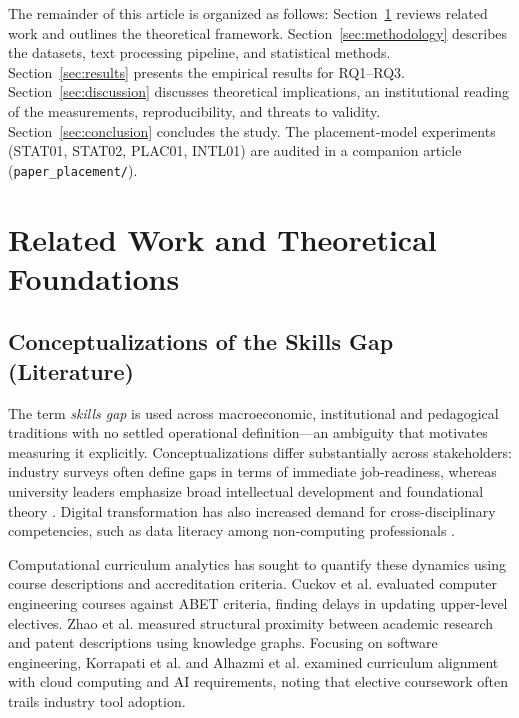 \documentclass[journal]{IEEEtran}
\begin{document}
The remainder of this article is organized as follows: Section~\ref{sec:related_work} reviews related work and outlines the theoretical framework. Section~\ref{sec:methodology} describes the datasets, text processing pipeline, and statistical methods. Section~\ref{sec:results} presents the empirical results for RQ1--RQ3. Section~\ref{sec:discussion} discusses theoretical implications, an institutional reading of the measurements, reproducibility, and threats to validity. Section~\ref{sec:conclusion} concludes the study. The placement-model experiments (STAT01, STAT02, PLAC01, INTL01) are audited in a companion article (\texttt{paper\_placement/}).

\section{Related Work and Theoretical Foundations}
\label{sec:related_work}

\subsection{Conceptualizations of the Skills Gap (Literature)}

The term \textit{skills gap} is used across macroeconomic, institutional and pedagogical traditions with no settled operational definition---an ambiguity that motivates measuring it explicitly. Conceptualizations differ substantially across stakeholders: industry surveys often define gaps in terms of immediate job-readiness, whereas university leaders emphasize broad intellectual development and foundational theory \cite{braun2026concept, tight2023employability}. Digital transformation has also increased demand for cross-disciplinary competencies, such as data literacy among non-computing professionals \cite{rikala2024understanding}.

Computational curriculum analytics has sought to quantify these dynamics using course descriptions and accreditation criteria. Cuckov et al. \cite{cuckov2022quantifying} evaluated computer engineering courses against ABET criteria, finding delays in updating upper-level electives. Zhao et al. \cite{zhao2026proximity} measured structural proximity between academic research and patent descriptions using knowledge graphs. Focusing on software engineering, Korrapati et al. \cite{korrapati2025aligning} and Alhazmi et al. \cite{alhazmi2025aligning} examined curriculum alignment with cloud computing and AI requirements, noting that elective coursework often trails industry tool adoption.
\end{document}
